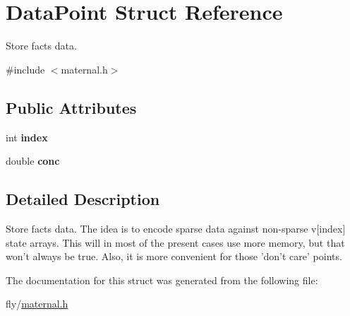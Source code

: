 \hypertarget{structDataPoint}{
\section{DataPoint Struct Reference}
\label{structDataPoint}
}


Store facts data.  


{\ttfamily \#include $<$maternal.h$>$}\subsection*{Public Attributes}
\begin{DoxyCompactItemize}
\item 
\hypertarget{structDataPoint_a3bc39601c6af9479a8443176a9367dba}{
int {\bfseries index}}
\label{structDataPoint_a3bc39601c6af9479a8443176a9367dba}

\item 
\hypertarget{structDataPoint_ada9976657cee888343318c9a2a17dac2}{
double {\bfseries conc}}
\label{structDataPoint_ada9976657cee888343318c9a2a17dac2}

\end{DoxyCompactItemize}


\subsection{Detailed Description}
Store facts data. The idea is to encode sparse data against non-\/sparse v\mbox{[}index\mbox{]} state arrays. This will in most of the present cases use more memory, but that won't always be true. Also, it is more convenient for those 'don't care' points. 

The documentation for this struct was generated from the following file:\begin{DoxyCompactItemize}
\item 
fly/\hyperlink{maternal_8h}{maternal.h}\end{DoxyCompactItemize}
